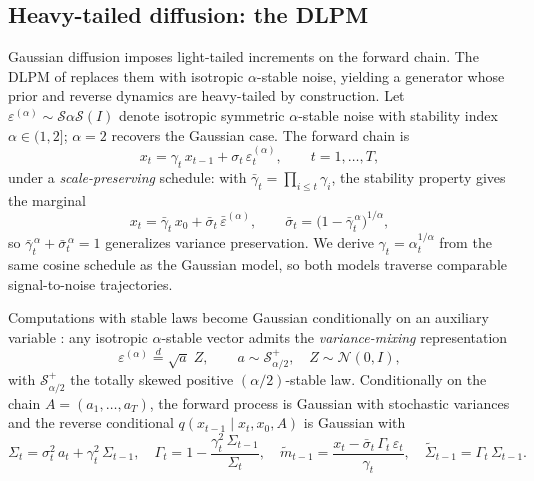 \documentclass[12pt,letterpaper]{article}
\begin{document}
\subsection{Heavy-tailed diffusion: the DLPM}\label{sec:dlpm}

Gaussian diffusion imposes light-tailed increments on the forward chain. The
DLPM of \citet{shariatian2024dlpm} replaces them with isotropic
$\alpha$-stable noise, yielding a generator whose prior and reverse dynamics
are heavy-tailed by construction. Let
$\varepsilon^{(\alpha)} \sim \mathcal{S}\alpha\mathcal{S}(I)$ denote
isotropic symmetric $\alpha$-stable noise with stability index
$\alpha \in (1, 2]$; $\alpha = 2$ recovers the Gaussian case. The forward
chain is
\begin{equation}
x_t = \gamma_t\, x_{t-1} + \sigma_t\, \varepsilon_t^{(\alpha)},
\qquad t = 1, \dots, T,
\end{equation}
under a \emph{scale-preserving} schedule: with
$\bar\gamma_t = \prod_{i\le t}\gamma_i$, the stability property gives the
marginal
\begin{equation}
x_t = \bar\gamma_t\, x_0 + \bar\sigma_t\, \bar\varepsilon^{(\alpha)},
\qquad
\bar\sigma_t = \bigl(1 - \bar\gamma_t^{\,\alpha}\bigr)^{1/\alpha},
\end{equation}
so $\bar\gamma_t^{\,\alpha} + \bar\sigma_t^{\,\alpha} = 1$ generalizes
variance preservation. We derive $\gamma_t = \alpha_t^{1/\alpha}$ from the
same cosine schedule as the Gaussian model, so both models traverse
comparable signal-to-noise trajectories.

Computations with stable laws become Gaussian conditionally on an auxiliary
variable \citep{samorodnitsky1994stable}: any isotropic $\alpha$-stable
vector admits the \emph{variance-mixing} representation
\begin{equation}
\varepsilon^{(\alpha)} \overset{d}{=} \sqrt{a}\; Z,
\qquad
a \sim \mathcal{S}_{\alpha/2}^{+},\quad Z \sim \mathcal{N}(0, I),
\label{eq:mixing}
\end{equation}
with $\mathcal{S}_{\alpha/2}^{+}$ the totally skewed positive
$(\alpha/2)$-stable law. Conditionally on the chain $A = (a_1,\dots,a_T)$,
the forward process is Gaussian with stochastic variances and the reverse
conditional $q(x_{t-1}\mid x_t, x_0, A)$ is Gaussian with
\begin{equation}
\Sigma_t = \sigma_t^2\, a_t + \gamma_t^2\, \Sigma_{t-1},
\quad
\Gamma_t = 1 - \frac{\gamma_t^2\,\Sigma_{t-1}}{\Sigma_t},
\quad
\tilde m_{t-1} = \frac{x_t - \bar\sigma_t\,\Gamma_t\,\varepsilon_t}{\gamma_t},
\quad
\tilde\Sigma_{t-1} = \Gamma_t\, \Sigma_{t-1}.
\label{eq:posterior}
\end{equation}
\end{document}
